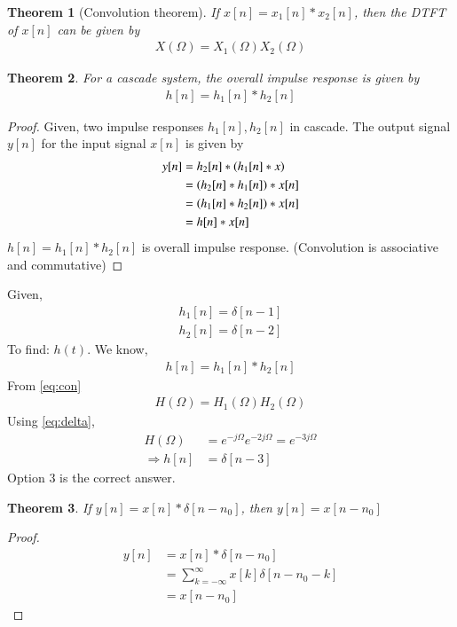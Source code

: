 \documentclass[journal,12pt,twocolumn]{IEEEtran}
\newtheorem{theorem}{Theorem}[section]
\begin{document}
\begin{theorem}[Convolution theorem]If $x[n]=x_1[n]*x_2[n]$, then the DTFT of $x[n]$ can be given by
\begin{align}
    X(\Omega)=X_1(\Omega)X_2(\Omega)\label{eq:con}
\end{align}
\end{theorem}
\begin{theorem}For a cascade system, the overall impulse response is given by
\begin{align}
    h[n]=h_1[n]*h_2[n]\label{eq:oimp}
\end{align}
\end{theorem}
\begin{proof}
Given, two impulse responses $h_1[n],h_2[n]$ in cascade. The output signal $y[n]$ for the input signal $x[n]$ is given by
\begin{align}
    y[n]&=h_2[n]*\left(h_1[n]*x\right)\\
    &=\left(h_2[n]*h_1[n]\right)*x[n]\\
    &=\left(h_1[n]*h_2[n]\right)*x[n]\\
    &=h[n]*x[n]
\end{align}
$h[n]=h_1[n]*h_2[n]$ is overall impulse response. (Convolution is associative and commutative)
\end{proof}
Given,
\begin{align}
    h_1[n]=\delta[n-1]\\
    h_2[n]=\delta[n-2]
\end{align}
To find: $h(t)$. We know, 
\begin{align}
h[n]=h_1[n]*h_2[n]
\end{align}
From \eqref{eq:con}
\begin{align}
H(\Omega)=H_1(\Omega)H_2(\Omega)
\end{align}
Using \eqref{eq:delta}, 
\begin{align}
H(\Omega)&=e^{-j\Omega}e^{-2j\Omega}=e^{-3j\Omega}\\
\Rightarrow h[n]&=\delta[n-3]
\end{align}
Option 3 is the correct answer.
\begin{theorem}
If $y[n]=x[n]*\delta[n-n_0]$, then $y[n]=x[n-n_0]$
\end{theorem}
\begin{proof}
\begin{align}
    y[n]&=x[n]*\delta[n-n_0]\\
    &=\displaystyle\sum_{k=-\infty}^{\infty} x[k]\delta[n-n_0-k]\\
    &=x[n-n_0]
\end{align}
\end{proof}
\end{document}
